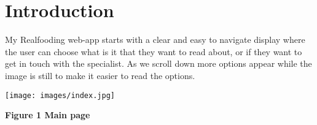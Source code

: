 \documentclass[10pt, a4paper]{article}
\title{\mytitle}
\author{\myauthor\hspace{1em}\\\contact\\Edinburgh Napier University\hspace{0.5em}-\hspace{0.5em}\mymodule}
\date{}
\begin{document}
	\maketitle
	\begin{abstract}
	    The aim of this coursework is to demonstrate my understanding of the Python Flask micro-framework by creating a prototype web application for an online directory about a given subject. The subject here is food, hence why the webpage's title is 'Realfooding' and encourages people to start eating healthier.

	    Food can be divided into real food or ultra-processed food. My web page explains the difference between them and contains many recipes and meal plans depending on the user's lifestyle, where everything is linked to make sure that every ingredient is explained and shows its benefits and drawbacks. Users can also leave doubts or comments that the web owner can then read in the Contact area and answer them.
	\end{abstract}


	\section{Introduction}
	My Realfooding web-app starts with a clear and easy to navigate display where the user can choose what is it that they want to read about, or if they want to get in touch with the specialist. As we scroll down more options appear while the image is still to make it easier to read the options.

	\texttt{[image: images/index.jpg]}

    \textbf{Figure 1 Main page}
    \vspace{2mm}
\end{document}
